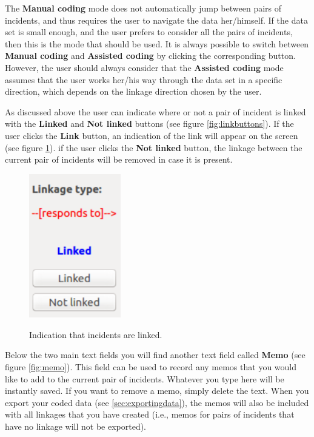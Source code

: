 \documentclass{memoir}
\begin{document}
The \textbf{Manual coding} mode does not automatically jump between pairs of incidents, and thus requires the user to navigate the data her/himself. If the data set is small enough, and the user prefers to consider all the pairs of incidents, then this is the mode that should be used. It is always possible to switch between \textbf{Manual coding} and \textbf{Assisted coding} by clicking the corresponding button. However, the user should always consider that the \textbf{Assisted coding} mode assumes that the user works her/his way through the data set in a specific direction, which depends on the linkage direction chosen by the user. 

As discussed above the user can indicate where or not a pair of incident is linked with the \textbf{Linked} and \textbf{Not linked} buttons (see figure \ref{fig:linkbuttons}). If the user clicks the \textbf{Link} button, an indication of the link will appear on the screen (see figure \ref{fig:linkage}). if the user clicks the \textbf{Not linked} button, the linkage between the current pair of incidents will be removed in case it is present. 

\begin{figure}[h!]
  \centering
  \caption{Indication that incidents are linked.}
  \includegraphics[width=40mm]{Screenshot_10.pdf}
  \label{fig:linkage}
\end{figure}

Below the two main text fields you will find another text field called \textbf{Memo} (see figure \ref{fig:memo}). This field can be used to record any memos that you would like to add to the current pair of incidents. Whatever you type here will be instantly saved. If you want to remove a memo, simply delete the text. When you export your coded data (see \ref{sec:exportingdata}), the memos will also be included with all linkages that you have created (i.e., memos for pairs of incidents that have no linkage will not be exported). 
\end{document}
